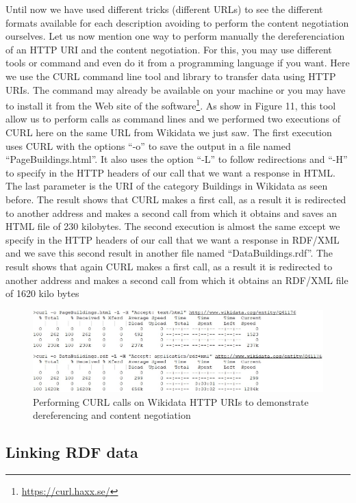 Until now we have used different tricks (different URLs) to see the
different formats available for each description avoiding to perform the
content negotiation ourselves. Let us now mention one way to perform
manually the dereferenciation of an HTTP URI and the content
negotiation. For this, you may use different tools or command and even
do it from a programming language if you want. Here we use the CURL
command line tool and library to transfer data using HTTP URIs. The
command may already be available on your machine or you may have to
install it from the Web site of the software\footnote{\url{https://curl.haxx.se/}}.
As show in Figure 11, this tool allow us to perform calls as command
lines and we performed two executions of CURL here on the same URL from
Wikidata we just saw. The first execution uses CURL with the options
``-o'' to save the output in a file named ``PageBuildings.html''. It
also uses the option ``-L'' to follow redirections and ``-H'' to specify
in the HTTP headers of our call that we want a response in HTML. The
last parameter is the URI of the category Buildings in Wikidata as seen
before. The result shows that CURL makes a first call, as a result it is
redirected to another address and makes a second call from which it
obtains and saves an HTML file of 230 kilobytes. The second execution is
almost the same except we specify in the HTTP headers of our call that
we want a response in RDF/XML and we save this second result in another
file named ``DataBuildings.rdf''. The result shows that again CURL makes
a first call, as a result it is redirected to another address and makes
a second call from which it obtains an RDF/XML file of 1620 kilo bytes

\begin{figure}
    \centering
    \includegraphics[width=5.0in]{media/ch5/figure-05-11.jpg}
    \caption{Performing CURL calls on Wikidata HTTP URIs to demonstrate
dereferencing and content negotiation}
    \label{fig:ch5.11}
\end{figure}

\hypertarget{linking-rdf-data}{%
\subsection{Linking RDF data}\label{linking-rdf-data}}

